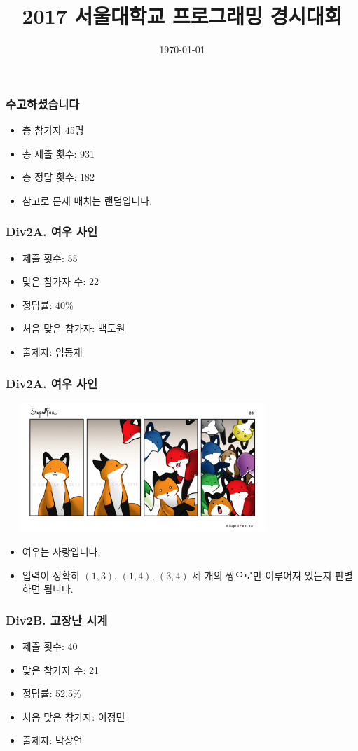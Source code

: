 \documentclass[xetex]{beamer}
\begin{document}
\title{2017 서울대학교 프로그래밍 경시대회}
\date{\today}

\frame{\titlepage}

\begin{frame}
  \frametitle{수고하셨습니다}
  \begin{itemize}
    \item 총 참가자 45명
    \item 총 제출 횟수: 931
    \item 총 정답 횟수: 182
    \item 참고로 문제 배치는 랜덤입니다.
  \end{itemize}
\end{frame}

\begin{frame}
  \frametitle{Div2A. 여우 사인}
  \begin{itemize}
    \item 제출 횟수: 55
    \item 맞은 참가자 수: 22
    \item 정답률: 40\%
    \item 처음 맞은 참가자: 백도원
    \item 출제자: 임동재
  \end{itemize}
\end{frame}

\begin{frame}
  \frametitle{Div2A. 여우 사인}
  \begin{center}
    \includegraphics[width=0.7\textwidth]{stupidfox.jpg}
  \end{center}
  \begin{itemize}
    \item 여우는 사랑입니다.
    \item 입력이 정확히 $(1, 3)$, $(1, 4)$, $(3, 4)$ 세 개의 쌍으로만 이루어져 있는지 판별하면 됩니다.
  \end{itemize}
\end{frame}

\begin{frame}
  \frametitle{Div2B. 고장난 시계}
  \begin{itemize}
    \item 제출 횟수: 40
    \item 맞은 참가자 수: 21
    \item 정답률: 52.5\%
    \item 처음 맞은 참가자: 이정민
    \item 출제자: 박상언
  \end{itemize}
\end{frame}
\end{document}

